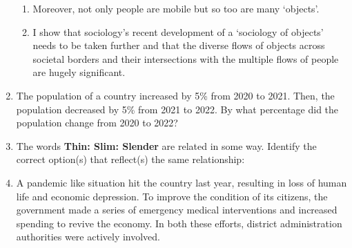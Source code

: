 \documentclass[12pt]{article}
\theoremstyle{remark}
\begin{document}
\begin{enumerate}
\begin{enumerate}
\item  Moreover, not only people are mobile but so too are many ‘objects’.
\item  I show that sociology’s recent development of a ‘sociology of objects’ needs to be taken further and that the diverse flows of objects across societal borders and their intersections with the multiple flows of people are hugely significant. 
\end{enumerate}
\begin{enumerate}  \end{enumerate}
\hfill{}
\item The population of a country increased by 5\% from 2020 to 2021. Then, the population decreased by 5\% from 2021 to 2022. By what percentage did the population change from 2020 to 2022? \\
\begin{enumerate}  \end{enumerate}
\hfill{}
\item The words \textbf{Thin: Slim: Slender} are related in some way. Identify the correct option(s) that reflect(s) the same relationship: 
\begin{enumerate}  \end{enumerate}
\hfill{}
\item  A pandemic like situation hit the country last year, resulting in loss of human life and economic depression. To improve the condition of its citizens, the government made a series of emergency medical interventions and increased spending to revive the economy. In both these efforts, district administration authorities were actively involved.

\end{enumerate}
\end{document}
